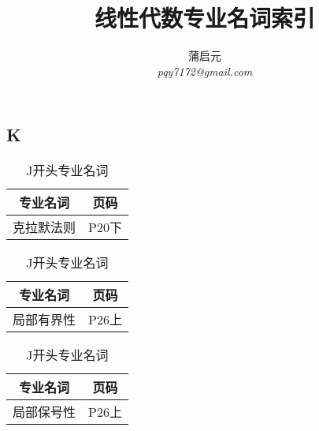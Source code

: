 \documentclass{wx672article}
\title{线性代数专业名词索引}
\author{蒲启元 \\
 \emph{pqy7172@gmail.com}}
\begin{document}
\maketitle{}

\begin{center}
  \section*{K}
\end{center}
\label{sec:j}


 \begin{table}[h!] %
      \centering
        \begin{tabular}[t]{c|c} %
          \hline
          专业名词 &  页码   \\
          \hline
          克拉默法则 & P20下 \\
          \hline
        \end{tabular}
        \hfill
        \begin{tabular}[t]{c|c}
          \hline
          专业名词  &  页码  \\
          \hline
          局部有界性 & P26上 \\
          \hline
        \end{tabular}
        \hfill
        \begin{tabular}[t]{c|c}
          \hline
          专业名词 &  页码 \\
          \hline
          局部保号性 & P26上 \\
          \hline
        \end{tabular}
      \caption{J开头专业名词}\label{tabJ}
    \end{table}
\end{document}
